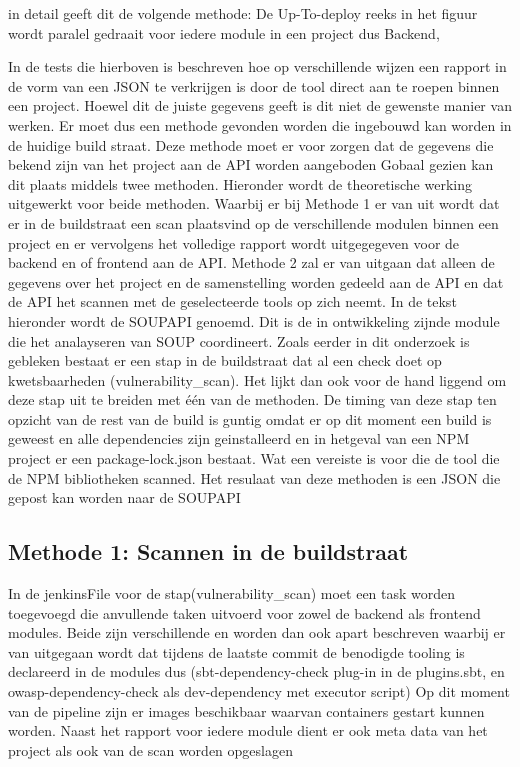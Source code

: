 in detail geeft dit de volgende methode: De Up-To-deploy reeks in het figuur wordt paralel gedraait voor iedere module in een project dus Backend,







In de tests die hierboven is beschreven hoe op verschillende wijzen een rapport in de vorm van een JSON te verkrijgen is door de tool direct aan te roepen binnen een project. Hoewel dit de juiste gegevens geeft is dit niet de gewenste manier van werken. Er moet dus een methode gevonden worden die ingebouwd kan worden in de huidige build straat. Deze methode moet er voor zorgen dat de gegevens die bekend zijn van het project aan de API worden aangeboden Gobaal gezien kan dit plaats middels twee methoden. Hieronder wordt de theoretische werking uitgewerkt voor beide methoden. Waarbij er bij Methode 1 er van uit wordt dat er in de buildstraat een scan plaatsvind op de verschillende modulen binnen een project en er vervolgens het volledige rapport wordt uitgegegeven voor de backend en of frontend aan de API. Methode 2 zal er van uitgaan dat alleen de gegevens over het project en de samenstelling worden gedeeld aan de API en dat de API het scannen met de geselecteerde tools op zich neemt. In de tekst hieronder wordt de SOUPAPI genoemd. Dit is de in ontwikkeling zijnde module die het analayseren van SOUP coordineert.
Zoals eerder in dit onderzoek is gebleken bestaat er een stap in de buildstraat dat al een check doet op kwetsbaarheden (vulnerability\_scan). Het lijkt dan ook voor de hand liggend om deze stap uit te breiden met één van de methoden. De timing van deze stap ten opzicht van de rest van de build is guntig omdat er op dit moment een build is geweest en alle dependencies zijn geinstalleerd en in hetgeval van een NPM project er een package-lock.json bestaat. Wat een vereiste is voor die de tool die de NPM bibliotheken scanned. Het resulaat van deze methoden is een JSON die gepost kan worden naar de SOUPAPI

\subsection{Methode 1: Scannen in de buildstraat}
In de jenkinsFile voor de stap(vulnerability\_scan) moet een task worden toegevoegd die anvullende taken uitvoerd voor zowel de backend als frontend modules. Beide zijn verschillende en worden dan ook apart beschreven waarbij er van uitgegaan wordt dat tijdens de laatste commit de benodigde tooling is declareerd in de modules dus (sbt-dependency-check plug-in in de plugins.sbt, en owasp-dependency-check als dev-dependency met executor script) Op dit moment van de pipeline zijn er images beschikbaar waarvan containers gestart kunnen worden. Naast het rapport voor iedere module dient er ook meta data van het project als ook van de scan worden opgeslagen

